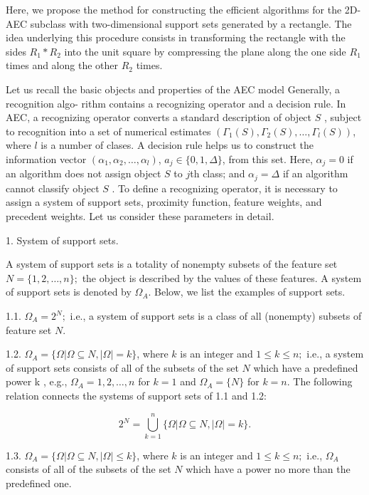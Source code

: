 Here, we propose the method for constructing the efficient algorithms 
for the 2D-AEC subclass with two-dimensional support sets generated 
by a rectangle. The idea underlying this procedure consists in 
transforming the rectangle with the sides  $R_1*R_2$  into 
the unit square by compressing the plane along the one side  $R_1$  
times and along the other  $R_2$  times. 

Let us recall the basic objects and properties of the AEC model 
Generally, a recognition algo- rithm contains a recognizing operator and a 
decision rule. In AEC, a recognizing operator converts a standard 
description of object $S$ , subject to recognition into a 
set of numerical estimates $(\Gamma_1(S),\Gamma_2(S),\ldots,\Gamma_l(S))$,
where $l$ is a number of clases.  A decision rule helps us to 
construct the information vector $(\alpha_1,\alpha_2,\ldots,\alpha_l)$,
$a_j\in\{0,1,\Delta\}$, from this set.  Here, $\alpha_j  = 0$ if an algorithm does not
assign object  $S$ to $j$th class;  and  $\alpha_j  =  \Delta$ 
if an algorithm cannot classify object  $S$ . To define a recognizing operator, 
it is necessary to assign a system of support sets, proximity function, 
feature weights, and precedent weights. Let us consider these parameters in detail.  

1. System of support sets. 

A system of support sets is a totality of nonempty subsets of the feature set  
$N  = \{1,2,\ldots,n\};$ the object is described by the values of these features. 
A system of support sets is denoted by  $\Omega_A$. 
Below, we list the examples of support sets.

1.1. $\Omega_A  = 2^N;$ i.e., a system of support sets is a class of all (nonempty) 
subsets of feature set  $N$.
 
1.2.  $\Omega_A=\{\Omega|\Omega\subseteq N,|\Omega|=k\}$, where  $k$  is an integer and $1\leq k\leq n;$ 
i.e., a system of support sets consists of all of the subsets of the set  $N$  which have 
a predefined power  k , e.g.,  $\Omega_A={{1},{2},\ldots,{n}}$ for  $k=1$ and $\Omega_A=\{N\}$ for  $k=n$. 
The following relation connects the systems of support sets of 1.1 and 1.2:

$$
2^N=\bigcup_{k=1}^n\{\Omega | \Omega \subseteq N, | \Omega | = k\}.
$$

1.3. $\Omega_A=\{\Omega|\Omega\subseteq N,|\Omega|\leq k\}$, where  $k$  is an integer
and $1\leq k\leq n;$ i.e.,  $\Omega_A$ consists of all of the subsets of the
set $N$ which have a power no more than the predefined one. 

